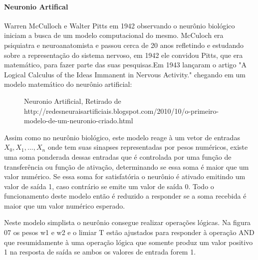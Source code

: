 \documentclass[	12pt, Times, openright, twoside, a4paper, english, brazil]{abntex2}
\begin{document}
          \paragraph*{Neuronio Artifical}
            Warren McCulloch e Walter Pitts em 1942 observando o neurônio biológico iniciam a busca de um modelo computacional do mesmo. McCuloch era psiquiatra e neuroanatomista e passou cerca de 20 anos refletindo e estudando sobre a representação do sistema nervoso, em 1942 ele convidou Pitts, que era matemático, para fazer parte das suas pesquisas.Em 1943 lançaram o artigo "A Logical Calculus of the Ideas Immanent in Nervous Activity." chegando em um modelo matemático do neurônio artificial: 

            \begin{figure}[!ht]
                \caption{Neuronio Artificial, Retirado de http://redesneuraisartificiais.blogspot.com/2010/10/o-primeiro-modelo-de-um-neuronio-criado.html\label{fig:NeuronioArtificial}}
            \end{figure}

            Assim como no neurônio biológico, este modelo reage à um vetor de entradas $X_0,X_1,...,X_n$ onde tem suas sinapses representadas por pesos numéricos, existe uma soma ponderada dessas entradas que é controlada por uma função de transferência ou função de ativação, determinando se essa soma é maior que um valor numérico. Se essa soma for satisfatória o neurônio é ativado emitindo um valor de saída 1, caso contrário se emite um valor de saída 0.
            Todo o funcionamento deste modelo então é reduzido a responder se a soma recebida é maior que um valor numérico esperado.

            Neste modelo simplista o neurônio consegue realizar operações lógicas. Na figura 07 os pesos w1 e w2 e o limiar T estão ajustados para responder à operação AND que resumidamente à uma operação lógica que somente produz um valor positivo 1 na resposta de saída se ambos os valores de entrada forem 1.
\end{document}
